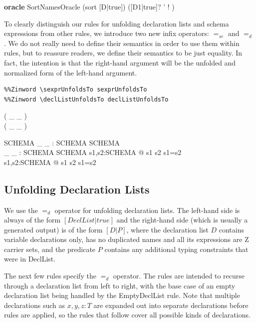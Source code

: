 \documentclass{entcs}
\newenvironment{zedoracle}[1]{\par\textbf{oracle }#1\vspace{-2ex}\infrule}{\endinfrule}
\newcommand{\sexprUnfoldsTo}{\mathrel{=_{se}}}
\newcommand{\declListUnfoldsTo}{\mathrel{=_d}}
\newcommand{\is}{\mathrel{is}}
\begin{document}
\begin{zedoracle}{SortNamesOracle}
  (sort [D|true]) \is ([D1|true]? \land [D2|true]' \land
                       [D3|true]! \land [D4|true])
\end{zedoracle}


To clearly distinguish our rules for unfolding declaration lists and
schema expressions from other rules, we introduce two new infix
operators: $\sexprUnfoldsTo$ and $\declListUnfoldsTo$.  
We do not really need to define their semantics in order to use them within
rules, but to reassure readers, we define their semantics to be just
equality.  In fact, the intention is that the right-hand argument
will be the unfolded and normalized form of the left-hand argument.

\begin{verbatim}
%%Zinword \sexprUnfoldsTo sexprUnfoldsTo
%%Zinword \declListUnfoldsTo declListUnfoldsTo
\end{verbatim}
%
\begin{zed}
  \relation ( \_ \sexprUnfoldsTo \_ ) \\
  \relation ( \_ \declListUnfoldsTo \_ )
\end{zed}
%
\begin{gendef}{SCHEMA}
  \_ \sexprUnfoldsTo \_ : SCHEMA \rel SCHEMA \\
  \_ \declListUnfoldsTo \_ : SCHEMA \rel SCHEMA
\where
  \forall s1,s2:SCHEMA @ s1 \sexprUnfoldsTo s2 \iff s1=s2 \\
  \forall s1,s2:SCHEMA @ s1 \declListUnfoldsTo s2 \iff s1=s2 \\
\end{gendef}


\subsection{Unfolding Declaration Lists}

We use the $\declListUnfoldsTo$ operator for unfolding declaration
lists.  The left-hand side is always of the form $[DeclList|true]$ and
the right-hand side (which is usually a generated output) is of the
form $[D|P]$, where the declaration list $D$ contains variable
declarations only, has no duplicated names and all its expressions are
Z carrier sets, and the predicate $P$ contains any additional typing
constraints that were in DeclList.

The next few rules specify the $\declListUnfoldsTo$ operator.
The rules are intended to recurse through a declaration list from left
to right, with the base case of an empty declaration list being handled
by the EmptyDeclList rule.  Note that multiple declarations such as
$x,y,z:T$ are expanded out into separate declarations before rules
are applied, so the rules that follow cover all possible kinds
of declarations.
\end{document}
